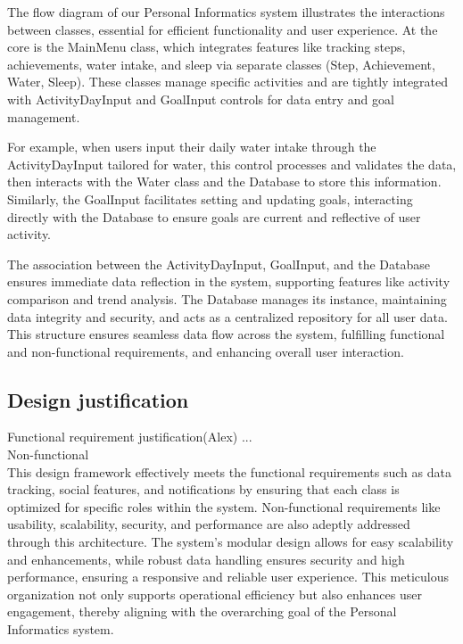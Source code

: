 \documentclass[12pt]{article}
\begin{document}
The flow diagram of our Personal Informatics system illustrates the interactions between classes, essential for efficient functionality and user experience. At the core is the MainMenu class, which integrates features like tracking steps, achievements, water intake, and sleep via separate classes (Step, Achievement, Water, Sleep). These classes manage specific activities and are tightly integrated with ActivityDayInput and GoalInput controls for data entry and goal management.\par

For example, when users input their daily water intake through the ActivityDayInput tailored for water, this control processes and validates the data, then interacts with the Water class and the Database to store this information. Similarly, the GoalInput facilitates setting and updating goals, interacting directly with the Database to ensure goals are current and reflective of user activity.\par

The association between the ActivityDayInput, GoalInput, and the Database ensures immediate data reflection in the system, supporting features like activity comparison and trend analysis. The Database manages its instance, maintaining data integrity and security, and acts as a centralized repository for all user data. This structure ensures seamless data flow across the system, fulfilling functional and non-functional requirements, and enhancing overall user interaction.\par

\subsection{Design justification}
Functional requirement justification(Alex)
...\\

Non-functional\\
This design framework effectively meets the functional requirements such as data tracking, social features, and notifications by ensuring that each class is optimized for specific roles within the system. Non-functional requirements like usability, scalability, security, and performance are also adeptly addressed through this architecture. The system’s modular design allows for easy scalability and enhancements, while robust data handling ensures security and high performance, ensuring a responsive and reliable user experience. This meticulous organization not only supports operational efficiency but also enhances user engagement, thereby aligning with the overarching goal of the Personal Informatics system.\par
\end{document}
